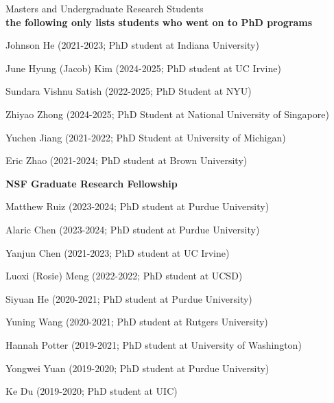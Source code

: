 \documentclass[10pt,letterpaper]{article}
\renewenvironment{itemize}{
  \begin{list}{}{
    \setlength{\leftmargin}{1.25em}
    \setlength{\itemsep}{0.25em}
    \setlength{\parskip}{0pt}
    \setlength{\parsep}{0.2em}
  }
}{
  \end{list}
}
\begin{document}
\begin{itemize}
\begin{enumerate}
        \end{enumerate}
  \item Masters and Undergraduate Research Students
  \\ \textbf{the following only lists students who went on to PhD programs}
        \begin{enumerate}
          \item Johnson He (2021-2023; PhD student at Indiana University)
          \item June Hyung (Jacob) Kim (2024-2025; PhD student at UC Irvine)
          \item Sundara Vishnu Satish (2022-2025; PhD Student at NYU)
          \item Zhiyao Zhong (2024-2025; PhD Student at National University of Singapore)
          \item Yuchen Jiang (2021-2022; PhD Student at University of Michigan)
          \item Eric Zhao (2021-2024; PhD student at Brown University)
            \begin{itemize}
              \item \textbf{NSF Graduate Research Fellowship}
            \end{itemize}
          \item Matthew Ruiz (2023-2024; PhD student at Purdue University)
          \item Alaric Chen (2023-2024; PhD student at Purdue University)
          \item Yanjun Chen (2021-2023; PhD student at UC Irvine)
          \item Luoxi (Rosie) Meng (2022-2022; PhD student at UCSD)
          \item Siyuan He (2020-2021; PhD student at Purdue University)
          \item Yuning Wang (2020-2021; PhD student at Rutgers University)
          \item Hannah Potter (2019-2021; PhD student at University of Washington)
          \item Yongwei Yuan (2019-2020; PhD student at Purdue University)
          \item Ke Du (2019-2020; PhD student at UIC)

\end{enumerate}
\end{itemize}
\end{document}
